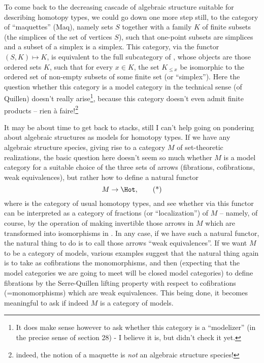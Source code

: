 To come back to the decreasing cascade of algebraic structure suitable
for describing homotopy types, we could go down one more step still,
to the category of ``maquettes'' (Maq), namely sets $S$ together with
a family $K$ of finite subsets (the simplices of the set of
vertices $S$), such that one-point subsets are simplices
and a subset of a simplex is a simplex. This category, via the functor
$(S,K) \mapsto K$, is equivalent to the full subcategory of \Ord,
whose objects are those ordered sets $K$, such that for every $x\in
K$, the set $K_{\le x}$ be isomorphic to the ordered set of non-empty
subsets of some finite set (or ``simplex''). Here the question whether
this category is a model category in the technical sense (of Quillen) doesn't
really arise\footnote{It does make sense however to ask whether this category is a ``modelizer'' (in the precise sense of section 28) - I believe it is, but didn't check it yet.}, because this category doesn't even admit finite products
-- rien \`a faire!\footnote{ indeed, the notion of a maquette is
  \emph{not} an algebraic structure species!}

\label{sec:23}%
It may be about time to get back to stacks, still I can't help going
on pondering about algebraic structures as models for homotopy
types. If we have any algebraic structure species, giving rise to a
category $M$ of set-theoretic realizations, the basic question here
doesn't seem so much whether $M$ is a model category for a suitable
choice of the three sets of arrows (fibrations, cofibrations, weak
equivalences), but rather how to define a natural functor
\begin{equation}
  \label{eq:23.star}
  M \to \Hot, \tag{*}
\end{equation}
where \Hot{} is the category of usual homotopy types, and see whether
via this functor \Hot{} can be interpreted as a category of fractions
(or ``localization'') of $M$ -- namely, of course, by the operation of
making invertible those arrows in $M$ which are transformed into
isomorphisms in \Hot{}. In any case, if we have such a natural functor,
the natural thing to do is to call those arrows ``weak
equivalences''. If we want $M$ to be a category of models, various
examples suggest that the natural thing again is to take as
cofibrations the monomorphisms, and then (expecting that the model
categories we are going to meet will be closed model categories) to
define fibrations by the Serre-Quillen lifting property with respect
to cofibrations (=monomorphisms) which are weak equivalences. This
being done, it becomes meaningful to ask if indeed $M$ is a category
of models.

